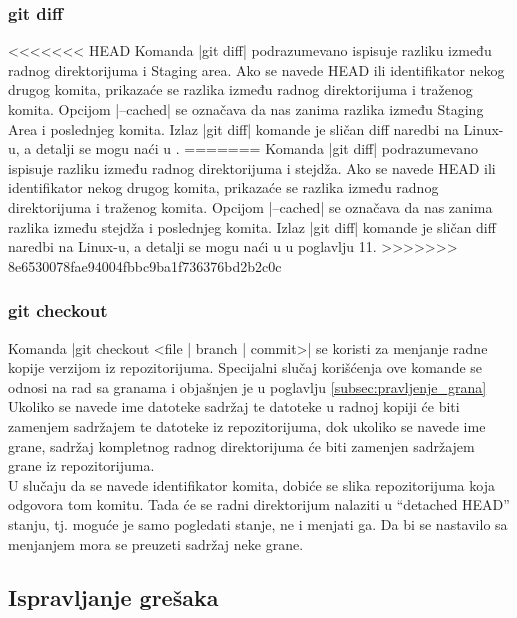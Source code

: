 \documentclass[a4paper]{article}
\begin{document}
{\begin{table}[h!]
\end{table}


\subsubsection*{git diff}
\label{subsec:git_diff}
<<<<<<< HEAD
Komanda |git diff| podrazumevano ispisuje razliku između radnog direktorijuma i Staging area. 
Ako se navede HEAD ili identifikator nekog drugog komita, prikazaće se razlika između radnog direktorijuma i traženog komita. Opcijom |--cached| se označava da nas zanima razlika između Staging Area i poslednjeg komita.
Izlaz |git diff| komande je sličan diff naredbi na Linux-u, a detalji se mogu naći u \cite{inspecting_diff}.
=======
Komanda |git diff| podrazumevano ispisuje razliku između radnog direktorijuma i stejdža. 
Ako se navede HEAD ili identifikator nekog drugog komita, prikazaće se razlika između radnog direktorijuma i traženog komita. Opcijom |--cached| se označava da nas zanima razlika između stejdža i poslednjeg komita.
Izlaz |git diff| komande je sličan diff naredbi na Linux-u, a detalji se mogu naći u \cite{pocketguide} u poglavlju 11.
>>>>>>> 8e6530078fae94004fbbc9ba1f736376bd2b2c0c


\subsubsection*{git checkout}
\label{checkout}
Komanda |git checkout <file | branch | commit>| se koristi za menjanje radne kopije verzijom iz repozitorijuma. Specijalni slučaj korišćenja ove komande se odnosi na rad sa granama i objašnjen je u poglavlju \ref{subsec:pravljenje_grana}\\

Ukoliko se navede ime datoteke sadržaj te datoteke u radnoj kopiji će biti zamenjem sadržajem te datoteke iz repozitorijuma, dok ukoliko se navede ime grane, sadržaj kompletnog radnog direktorijuma će biti zamenjen sadržajem grane iz repozitorijuma.\\

U slučaju da se navede identifikator komita, dobiće se slika repozitorijuma koja odgovora tom komitu. Tada će se radni direktorijum nalaziti u ``detached HEAD'' stanju, tj. moguće je samo pogledati stanje, ne i menjati ga. Da bi se nastavilo sa menjanjem mora se preuzeti sadržaj neke grane.


\subsection{Ispravljanje grešaka}
\label{subsec:greske}

}
\end{document}
